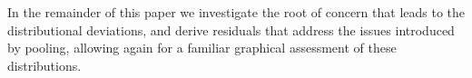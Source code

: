 \documentclass[12pt]{article} %
\newcommand{\hh}[1]{{\color{orange} #1}}
\begin{document}
\begin{table}[t]

\end{table}




In the remainder of this paper we investigate the root of concern that leads to the distributional deviations, and derive residuals that address the issues introduced by pooling, allowing again for a familiar graphical assessment of these distributions.
\end{document}
